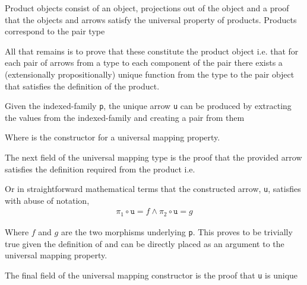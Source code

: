 
Product objects consist of an object, projections out of the object and a proof
that the objects and arrows satisfy the universal property of products. Products
correspond to the pair type




All that remains is to prove that these constitute the product object i.e. that
for each pair of arrows from a type to each component of the pair there exists a
(extensionally propositionally) unique function from the type to the pair object
that satisfies the definition of the product.


Given the indexed-family \verb|p|, the unique arrow \verb|u| can be produced by extracting
the values from the indexed-family and creating a pair from them



Where  is the constructor for
a universal mapping property.

The next field of the universal mapping type is the proof that the provided
arrow satisfies the definition required from the product i.e.


Or in straightforward mathematical terms that the constructed arrow, \verb|u|,
satisfies with abuse of notation,
\begin{align*}
    \pi_{1} \circ \texttt{u} = f \land \pi_{2} \circ \texttt{u} = g
\end{align*}

Where $f$ and $g$ are the two morphisms underlying \verb|p|. This proves to be
trivially true given the definition of  and can be
directly placed as an argument to the universal mapping property.


The final field of the universal mapping constructor is the proof that \verb|u|
is unique



